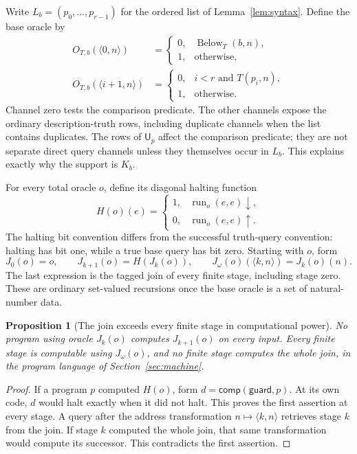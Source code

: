 \documentclass[11pt]{article}
\newtheorem{proposition}[theorem]{Proposition}
\newcommand{\U}{\mathsf U}
\newcommand{\Below}{\operatorname{Below}}
\newcommand{\run}{\operatorname{run}}
\newcommand{\pair}[2]{\langle #1,#2\rangle}
\newcommand{\diverges}{\uparrow}
\newcommand{\halts}{\downarrow}
\begin{document}
Write $L_b=(p_0,\ldots,p_{r-1})$ for the ordered list of
Lemma~\ref{lem:syntax}. Define the base oracle by
\begin{align}
 O_{T,b}(\pair0n)&=
    \begin{cases}0,&\Below_T(b,n),\\1,&\text{otherwise},\end{cases}
       \label{eq:base0}\\
 O_{T,b}(\pair{i+1}n)&=
    \begin{cases}0,&i<r\text{ and }T(p_i,n),\\1,&\text{otherwise}.
       \end{cases}\label{eq:base1}
\end{align}
Channel zero tests the comparison predicate. The other channels expose the
ordinary description-truth rows, including duplicate channels when the list
contains duplicates. The rows of $\U_p$ affect the comparison predicate;
they are not separate direct query channels unless they themselves occur in
$L_b$. This explains exactly why the support is $K_b$.

For every total oracle $o$, define its diagonal halting function
\[
 H(o)(e)=
 \begin{cases}1,&\run_o(e,e)\halts,\\0,&\run_o(e,e)\diverges.
 \end{cases}
\]
The halting bit convention differs from the successful truth-query convention:
halting has bit one, while a true base query has bit zero.
Starting with $o$, form
\[
 J_0(o)=o,\qquad J_{k+1}(o)=H(J_k(o)),\qquad
 J_\omega(o)(\pair kn)=J_k(o)(n).
\]
The last expression is the tagged join of every finite stage, including stage
zero. These are ordinary set-valued recursions once the base oracle is a set
of natural-number data.

\begin{proposition}[The join exceeds every finite stage in computational power]
No program using oracle $J_k(o)$ computes $J_{k+1}(o)$ on every input.
Every finite stage is computable using $J_\omega(o)$, and no finite stage
computes the whole join, in the program language of Section~\ref{sec:machine}.
\end{proposition}
\begin{proof}
If a program $p$ computed $H(o)$, form
$d=\mathsf{comp}(\mathsf{guard},p)$. At its own code, $d$ would halt exactly
when it did not halt. This proves the first assertion at every stage.
A query after the address transformation $n\mapsto\pair kn$ retrieves
stage $k$ from the join. If stage $k$ computed the whole join, that same
transformation would compute its successor. This contradicts the first assertion.
\end{proof}
\end{document}
